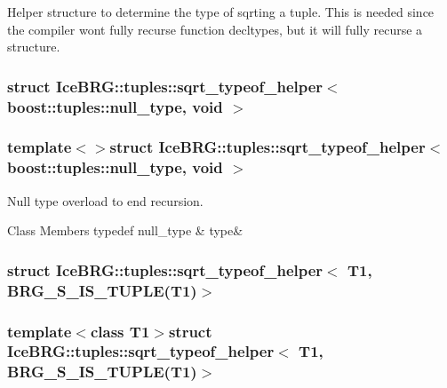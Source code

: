 Helper structure to determine the type of sqrting a tuple. This is needed since the compiler won\textquotesingle{}t fully recurse function decltypes, but it will fully recurse a structure. \label{structIceBRG_1_1tuples_1_1sqrt__typeof__helper_3_01boost_1_1tuples_1_1null__type_00_01void_01_4}
\hypertarget{namespaceIceBRG_1_1tuples_structIceBRG_1_1tuples_1_1sqrt__typeof__helper_3_01boost_1_1tuples_1_1null__type_00_01void_01_4}{}
\subsubsection{struct Ice\+B\+R\+G\+:\+:tuples\+:\+:sqrt\+\_\+typeof\+\_\+helper$<$ boost\+:\+:tuples\+:\+:null\+\_\+type, void $>$}
\subsubsection*{template$<$$>$struct Ice\+B\+R\+G\+::tuples\+::sqrt\+\_\+typeof\+\_\+helper$<$ boost\+::tuples\+::null\+\_\+type, void $>$}

Null type overload to end recursion. \begin{DoxyFields}{Class Members}
\hypertarget{namespaceIceBRG_1_1tuples_a18937c38bf20064bca7041e358671bfc}{}typedef null\+\_\+type\label{namespaceIceBRG_1_1tuples_a18937c38bf20064bca7041e358671bfc}
&
type&
\\
\hline

\end{DoxyFields}
\label{structIceBRG_1_1tuples_1_1sqrt__typeof__helper_3_01T1_00_01BRG__S__IS__TUPLE_07T1_08_4}
\hypertarget{namespaceIceBRG_1_1tuples_structIceBRG_1_1tuples_1_1sqrt__typeof__helper_3_01T1_00_01BRG__S__IS__TUPLE_07T1_08_4}{}
\subsubsection{struct Ice\+B\+R\+G\+:\+:tuples\+:\+:sqrt\+\_\+typeof\+\_\+helper$<$ T1, B\+R\+G\+\_\+\+S\+\_\+\+I\+S\+\_\+\+T\+U\+P\+L\+E(T1)$>$}
\subsubsection*{template$<$class T1$>$struct Ice\+B\+R\+G\+::tuples\+::sqrt\+\_\+typeof\+\_\+helper$<$ T1, B\+R\+G\+\_\+\+S\+\_\+\+I\+S\+\_\+\+T\+U\+P\+L\+E(\+T1)$>$}

